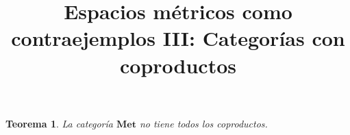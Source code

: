 \documentclass[draft,letter,10pt,notitlepage]{amsart}
\title{Espacios métricos como contraejemplos III: Categorías con coproductos}
\date{}
\newtheorem{theorem}{Teorema}
\theoremstyle{definition}
\theoremstyle{remark}
\begin{document}
\maketitle

\begin{theorem}
  La categoría \( \mathbf{Met}\) no tiene todos los coproductos.
\end{theorem}
\end{document}

